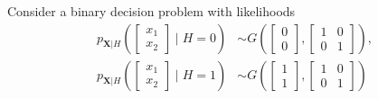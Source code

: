 \begin{solution}
\end{solution}

\else

\question Consider a binary decision problem with likelihoods
\begin{align*}
p_{\mathbf X|H}\left( \begin{bmatrix} x_1 \\ x_2 \end{bmatrix} \mid H=0\right) 
	&\sim G\left(\begin{bmatrix} 0 \\ 0 \end{bmatrix}, 
	             \begin{bmatrix} 1 & 0 \\ 0 & 1 \end{bmatrix} \right), \\
p_{\mathbf X|H}\left( \begin{bmatrix} x_1 \\ x_2 \end{bmatrix} \mid H=1\right) 
    &\sim G\left(\begin{bmatrix} 1 \\ 1 \end{bmatrix}, 
	             \begin{bmatrix} 1 & 0 \\ 0 & 1 \end{bmatrix} \right) 
\end{align*}

